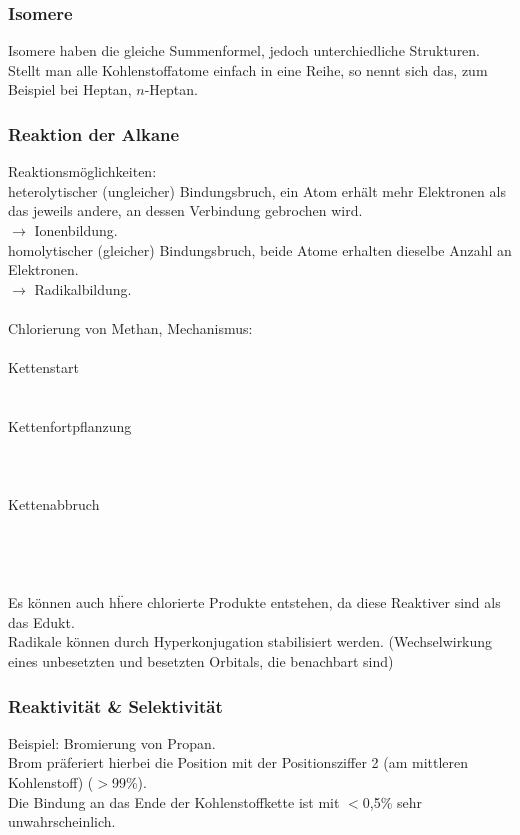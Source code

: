 \documentclass[a4paper, fleqn]{article}
\begin{document}
\subsubsection{Isomere}
Isomere haben die gleiche Summenformel, jedoch unterchiedliche Strukturen.\\
Stellt man alle Kohlenstoffatome einfach in eine Reihe, so nennt sich das, zum Beispiel bei Heptan, $n$-Heptan.

\subsubsection{Reaktion der Alkane}
Reaktionsm\"oglichkeiten:\\
heterolytischer (ungleicher) Bindungsbruch, ein Atom erh\"alt mehr Elektronen als das jeweils andere, an dessen Verbindung gebrochen wird.\\
$\rightarrow$ Ionenbildung.\\
homolytischer (gleicher) Bindungsbruch, beide Atome erhalten dieselbe Anzahl an Elektronen.\\
$\rightarrow$ Radikalbildung.\\\\
Chlorierung von Methan, Mechanismus:\\\\
Kettenstart\\
\\\\
Kettenfortpflanzung\\
\\
\\\\
Kettenabbruch\\
\\
\\
\\\\
Es k\"onnen auch h\"here chlorierte Produkte entstehen, da diese Reaktiver sind als das Edukt.\\
Radikale k\"onnen durch Hyperkonjugation stabilisiert werden. (Wechselwirkung eines unbesetzten und besetzten Orbitals, die benachbart sind)

\subsubsection{Reaktivit\"at \& Selektivit\"at}
Beispiel: Bromierung von Propan.\\
Brom pr\"aferiert hierbei die Position mit der Positionsziffer 2 (am mittleren Kohlenstoff) ($>$99\%).\\
Die Bindung an das Ende der Kohlenstoffkette ist mit $<$0,5\% sehr unwahrscheinlich.
\end{document}
